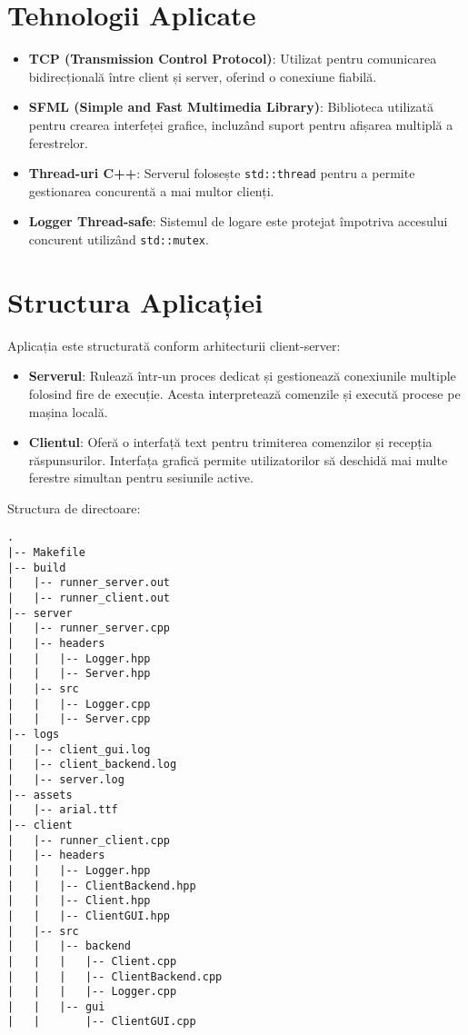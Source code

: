 \documentclass[runningheads]{llncs}
\begin{document}
\section{Tehnologii Aplicate}
\begin{itemize}
    \item \textbf{TCP (Transmission Control Protocol)}: Utilizat pentru comunicarea bidirecțională între client și server, oferind o conexiune fiabilă.
    \item \textbf{SFML (Simple and Fast Multimedia Library)}: Biblioteca utilizată pentru crearea interfeței grafice, incluzând suport pentru afișarea multiplă a ferestrelor.
    \item \textbf{Thread-uri C++}: Serverul folosește \texttt{std::thread} pentru a permite gestionarea concurentă a mai multor clienți.
    \item \textbf{Logger Thread-safe}: Sistemul de logare este protejat împotriva accesului concurent utilizând \texttt{std::mutex}.
\end{itemize}

\section{Structura Aplicației}
Aplicația este structurată conform arhitecturii client-server:
\begin{itemize}
    \item \textbf{Serverul}: Rulează într-un proces dedicat și gestionează conexiunile multiple folosind fire de execuție. Acesta interpretează comenzile și execută procese pe mașina locală.
    \item \textbf{Clientul}: Oferă o interfață text pentru trimiterea comenzilor și recepția răspunsurilor. Interfața grafică permite utilizatorilor să deschidă mai multe ferestre simultan pentru sesiunile active.
\end{itemize}

Structura de directoare:
\begin{verbatim}
.
|-- Makefile
|-- build
|   |-- runner_server.out
|   |-- runner_client.out
|-- server
|   |-- runner_server.cpp
|   |-- headers
|   |   |-- Logger.hpp
|   |   |-- Server.hpp
|   |-- src
|   |   |-- Logger.cpp
|   |   |-- Server.cpp
|-- logs
|   |-- client_gui.log
|   |-- client_backend.log
|   |-- server.log
|-- assets
|   |-- arial.ttf
|-- client
|   |-- runner_client.cpp
|   |-- headers
|   |   |-- Logger.hpp
|   |   |-- ClientBackend.hpp
|   |   |-- Client.hpp
|   |   |-- ClientGUI.hpp
|   |-- src
|   |   |-- backend
|   |   |   |-- Client.cpp
|   |   |   |-- ClientBackend.cpp
|   |   |   |-- Logger.cpp
|   |   |-- gui
|   |       |-- ClientGUI.cpp
\end{verbatim}
\end{document}

